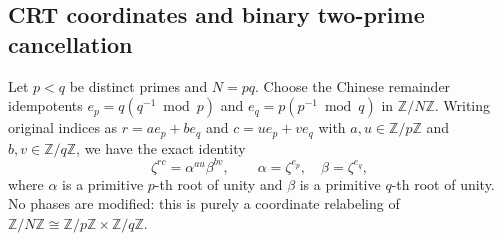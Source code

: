 \documentclass[11pt,reqno]{amsart}
\numberwithin{equation}{section}
\theoremstyle{definition}
\theoremstyle{remark}
\newcommand{\Z}{\mathbb{Z}}
\begin{document}
\subsection{CRT coordinates and binary two-prime cancellation}
Let $p<q$ be distinct primes and $N=pq$. Choose the Chinese remainder idempotents $e_p = q(q^{-1}\bmod p)$ and $e_q = p(p^{-1}\bmod q)$ in $\Z/N\Z$. Writing original indices as $r = a e_p + b e_q$ and $c = u e_p + v e_q$ with $a,u\in\Z/p\Z$ and $b,v\in\Z/q\Z$, we have the exact identity
\begin{equation}
\label{eq:crt-phase}
\zeta^{rc} = \alpha^{au}\beta^{bv},\qquad \alpha = \zeta^{e_p},\quad \beta = \zeta^{e_q},
\end{equation}
where $\alpha$ is a primitive $p$-th root of unity and $\beta$ is a primitive $q$-th root of unity. No phases are modified: this is purely a coordinate relabeling of $\Z/N\Z\cong \Z/p\Z\times\Z/q\Z$.
\end{document}
